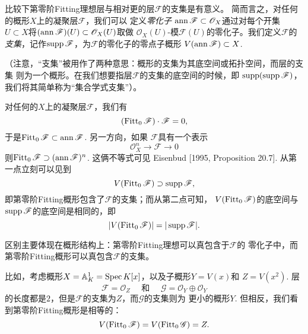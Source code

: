 比较下第零阶Fitting理想层与相对更\naive 的层$\mathscr F$的支集是有意义。
简而言之，对任何的概形$X$上的凝聚层$\mathscr F$，我们可以
定义\textit{零化子} $\operatorname{ann} \mathscr F\subset \mathscr O_X$通过对每个开集
$U\subset X$将$(\operatorname{ann} \mathscr{F})(U) \subset \mathscr{O}_X(U)$取做
$\mathscr O_X(U)$-模$\mathscr F(U)$的零化子。我们定义$\mathscr F$的
\textit{支集}，记作$\operatorname{supp} \mathscr F$，为$\mathscr F$的零化子的零点子概形
$V(\operatorname{ann} \mathscr{F}) \subset X$.

（注意，“支集”被用作了两种意思：概形的支集为其底空间或拓扑空间，而层的支集
则为一个概形。在我们想要指层$\mathscr F$的支集的底空间的时候，即
$\operatorname{supp}(\operatorname{supp} \mathscr F)$，我们将其简单称为“集合学式支集”）。

对任何的$X$上的凝聚层$\mathscr F$，我们有
\[
    (\operatorname{Fitt}_0 \mathscr{F}) \cdot \mathscr{F}=0,
\]
于是$\operatorname{Fitt}_0 \mathscr F\subset \operatorname{ann} \mathscr F$. 另一方向，如果
$\mathscr F$具有一个表示
\[
    \mathscr{O}_X^n \longrightarrow \mathscr{F} \longrightarrow 0
\]
则$\operatorname{Fitt}_0 \mathscr F\supset (\operatorname{ann} \mathscr F)^n$. 这俩不等式可见
Eisenbud [1995, Proposition 20.7]. 从第一点立刻可以见到
\[
    V(\operatorname{Fitt}_0 \mathscr F)\supset \operatorname{supp} \mathscr F,
\]
即第零阶Fitting概形包含了$\mathscr F$的支集；而从第二点可知，
$V(\operatorname{Fitt}_0 \mathscr F)$的底空间与$\operatorname{supp} \mathscr F$的底空间是相同的，即
\[
    |V(\operatorname{Fitt}_0\mathscr F)|=|\operatorname{supp} \mathscr F|.
\]

区别主要体现在概形结构上：第零阶Fitting理想可以真包含于$\mathscr F$的
零化子中，而第零阶Fitting概形可以真包含$\mathscr F$的支集。

比如，考虑概形$X=\mathbb{A}_K^1=\operatorname{Spec} K[x]$，以及子概形$Y=V(x)$和
$Z=V(x^2)$. 层
\[
    \mathscr{F}=\mathscr{O}_Z \quad \text { 和 } \quad 
    \mathscr{G}=\mathscr{O}_Y \oplus \mathscr{O}_Y
\]
的长度都是$2$，但是$\mathscr F$的支集为$Z$，而$\mathscr G$的支集则为
更小的概形$Y$. 但相反，我们看到第零阶Fitting概形是相等的：
\[
    V(\operatorname{Fitt}_0 \mathscr{F})=V(\operatorname{Fitt}_0 \mathscr{G})=Z.
\]



